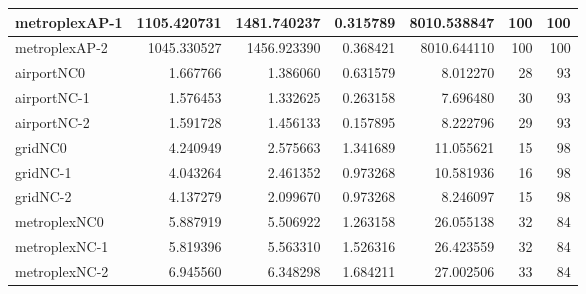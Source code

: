 \begin{longtable}{|l|r|r|r|r|r|r|}
metroplexAP-1 & 1105.420731 & 1481.740237 & 0.315789 & 8010.538847 & 100 & 100 \\ \hline
metroplexAP-2 & 1045.330527 & 1456.923390 & 0.368421 & 8010.644110 & 100 & 100 \\ \hline
airportNC0 & 1.667766 & 1.386060 & 0.631579 & 8.012270 & 28 & 93 \\ \hline
airportNC-1 & 1.576453 & 1.332625 & 0.263158 & 7.696480 & 30 & 93 \\ \hline
airportNC-2 & 1.591728 & 1.456133 & 0.157895 & 8.222796 & 29 & 93 \\ \hline
gridNC0 & 4.240949 & 2.575663 & 1.341689 & 11.055621 & 15 & 98 \\ \hline
gridNC-1 & 4.043264 & 2.461352 & 0.973268 & 10.581936 & 16 & 98 \\ \hline
gridNC-2 & 4.137279 & 2.099670 & 0.973268 & 8.246097 & 15 & 98 \\ \hline
metroplexNC0 & 5.887919 & 5.506922 & 1.263158 & 26.055138 & 32 & 84 \\ \hline
metroplexNC-1 & 5.819396 & 5.563310 & 1.526316 & 26.423559 & 32 & 84 \\ \hline
metroplexNC-2 & 6.945560 & 6.348298 & 1.684211 & 27.002506 & 33 & 84 \\ \hline
\end{longtable}

